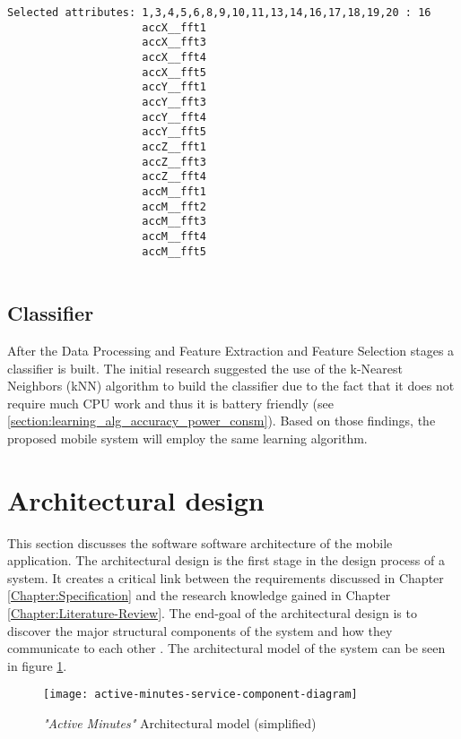    \begin{lstlisting}[caption=\gls{cfs} algorithm result over the initial feature set of size 20,
    frame=tlrbr,
    basicstyle=\small,
    captionpos=b,
    label=cfs-algorithm-result]
    Selected attributes: 1,3,4,5,6,8,9,10,11,13,14,16,17,18,19,20 : 16
                     accX__fft1
                     accX__fft3
                     accX__fft4
                     accX__fft5
                     accY__fft1
                     accY__fft3
                     accY__fft4
                     accY__fft5
                     accZ__fft1
                     accZ__fft3
                     accZ__fft4
                     accM__fft1
                     accM__fft2
                     accM__fft3
                     accM__fft4
                     accM__fft5
    
    \end{lstlisting}
    
    \subsection{Classifier}
    After the Data Processing and Feature Extraction and Feature Selection stages a classifier is built. The initial research suggested the use of the k-Nearest Neighbors (kNN) algorithm to build the classifier due to the fact that it does not require much CPU work and thus it is battery friendly (see \ref{section:learning_alg_accuracy_power_consm}). Based on those findings, the proposed mobile system will employ the same learning algorithm. 
    
        
    \section{Architectural design}
    \label{section:architectural-design}
    This section discusses the software software architecture of the mobile application. The architectural design is the first stage in the design process of a system. It creates a critical link between the requirements discussed in Chapter \ref{Chapter:Specification} and the research knowledge gained in Chapter \ref{Chapter:Literature-Review}. The end-goal of the architectural design is to discover the major structural components of the system and how they communicate to each other \citep[148]{sommerville2010}. The architectural model of the system can be seen in figure \ref{fig:architectural_design_component_diagram}.
    
    \begin{figure}[H]
        \centering
        \texttt{[image: active-minutes-service-component-diagram]}
        \caption{ \textit{"Active Minutes"} Architectural model (simplified)}
        \label{fig:architectural_design_component_diagram}
    \end{figure}
    
